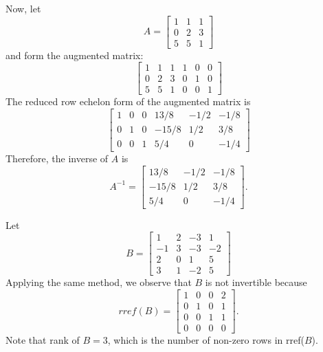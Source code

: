 Now, let
$$A = \left[\begin{array}{ccc}1&1&1\\0&2&3\\5&5&1\end{array}\right]$$
and form the augmented matrix:
$$
\left[\begin{array}{ccc|ccc}1&1&1&1&0&0\\0&2&3&0&1&0\\5&5&1&0&0&1\end{array}\right]
$$
The reduced row echelon form of the augmented matrix is
$$
\left[\begin{array}{ccc|ccc}1&0&0&13/8&-1/2&-1/8 \\ 0&1&0&-15/8&1/2&3/8 \\ 0&0&1&5/4&0&-1/4 \end{array}\right]
$$
Therefore, the inverse of $A$ is
$$
A^{-1} = \left[\begin{array}{ccc}13/8&-1/2&-1/8 \\ -15/8&1/2&3/8 \\ 5/4&0&-1/4 \end{array}\right].
$$

Let
$$B = \left[\begin{array}{cccc}1&2&-3&1\\-1&3&-3&-2\\2&0&1&5\\3&1&-2&5\end{array}\right]$$
Applying the same method, we observe that $B$ is not invertible because
$$
rref(B) = \left[\begin{array}{cccc}1&0&0&2\\0&1&0&1\\0&0&1&1\\0&0&0&0\end{array}\right].
$$
Note that rank of $B=3$, which is the number of non-zero rows in rref($B$).

